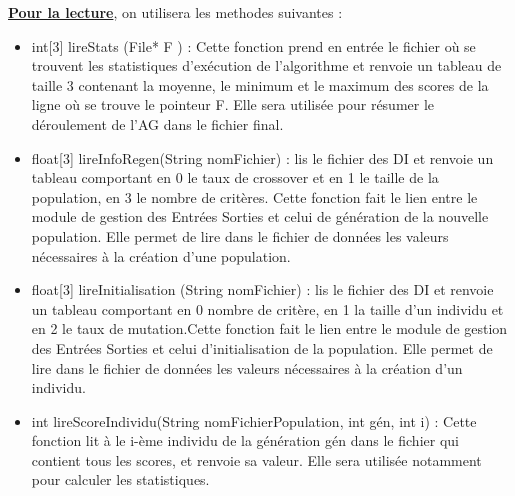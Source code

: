 \documentclass[a4paper,11pt]{article}
\begin{document}
\begin{itemize}
			\end{itemize}
			
			\underline{\bf Pour la lecture}, on utilisera les methodes suivantes :\\
			\begin{itemize}
				\item int[3] lireStats (File* F ) : Cette fonction prend en entrée le fichier où se trouvent les statistiques d’exécution de l’algorithme et renvoie un tableau de taille 3 contenant la moyenne, le minimum et le maximum des scores de la ligne où se trouve le pointeur F. Elle sera utilisée pour résumer le déroulement de l'AG dans le fichier final.\vspace{0.2cm}
				\item float[3] lireInfoRegen(String nomFichier) : lis le fichier des DI et renvoie un tableau comportant en 0 le taux de crossover et en 1 le taille de la population, en 3 le nombre de critères.
					Cette fonction fait le lien entre le module de gestion des Entrées Sorties et celui de génération de la nouvelle population.
					Elle permet de lire dans le fichier de données les valeurs nécessaires à la création d’une population.\vspace{0.2cm}
				\item float[3] lireInitialisation (String nomFichier) : lis le fichier des DI et renvoie un tableau comportant en 0 nombre de critère, en 1 la taille d’un individu et en 2 le taux de mutation.Cette fonction fait le lien entre le module de gestion des Entrées Sorties et celui d’initialisation de la population. 
					Elle permet de lire dans le fichier de données les valeurs nécessaires à la création d’un individu.\vspace{0.2cm}
				\item int lireScoreIndividu(String nomFichierPopulation, int gén, int i) : Cette fonction lit à le i-ème individu de la génération gén dans le fichier qui contient tous les scores, et renvoie sa valeur. Elle sera utilisée notamment pour calculer les statistiques.
			\end{itemize}
			
\end{document}
